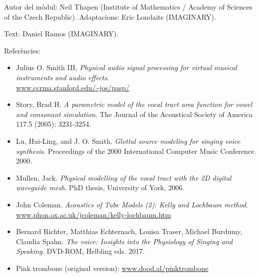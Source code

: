 \begin{sectcredits}

\item[Autor del mòdul:] Neil Thapen (Institute of Mathematics / Academy of Sciences of the Czech Republic). Adaptacions: Eric Londaits (IMAGINARY).

\item[Text:] Daniel Ramos (IMAGINARY).

\item[Referències:] \strut 
\noindent \begin{itemize}[leftmargin=*]
\item Julius O. Smith III, \emph{Physical audio signal processing for virtual musical instruments and audio effects}. \\\url{www.ccrma.stanford.edu/~jos/pasp/}

\item Story, Brad H. \emph{A parametric model of the vocal tract area function for vowel and consonant simulation}. The Journal of the Acoustical Society of America 117.5 (2005): 3231-3254.

\item Lu, Hui-Ling, and J. O. Smith. \emph{Glottal source modeling for singing voice synthesis}. Proceedings of the 2000 International Computer Music Conference. 2000.

\item Mullen, Jack. \emph{Physical modelling of the vocal tract with the 2D digital waveguide mesh}. PhD thesis, University of York, 2006.

\item John Coleman. \emph{Acoustics of Tube Models (2): Kelly and Lochbaum method}. \\
\url{www.phon.ox.ac.uk/jcoleman/kelly-lochbaum.htm}

\item Bernard Richter, Matthias Echternach, Louisa Traser, Michael Burdumy, Claudia Spahn. \emph{The voice: Insights into the Physiology of Singing and Speaking}. DVD-ROM, Helbling eds. 2017.

\item Pink trombone (original version): \url{www.dood.al/pinktrombone}
\end{itemize}

\end{sectcredits}

